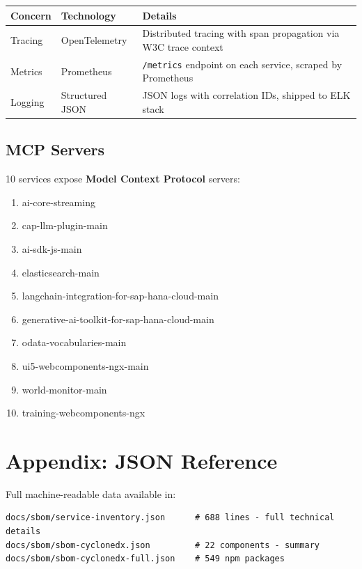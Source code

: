 \documentclass[11pt,a4paper]{article}
\begin{document}
\begin{tabular}{@{}L{3cm}L{3cm}L{8cm}@{}}
\toprule
\textbf{Concern} & \textbf{Technology} & \textbf{Details} \\
\midrule
Tracing & OpenTelemetry & Distributed tracing with span propagation via W3C trace context \\
Metrics & Prometheus & \texttt{/metrics} endpoint on each service, scraped by Prometheus \\
Logging & Structured JSON & JSON logs with correlation IDs, shipped to ELK stack \\
\bottomrule
\end{tabular}

\subsection{MCP Servers}

10 services expose \textbf{Model Context Protocol} servers:

\begin{enumerate}[noitemsep]
    \item ai-core-streaming
    \item cap-llm-plugin-main
    \item ai-sdk-js-main
    \item elasticsearch-main
    \item langchain-integration-for-sap-hana-cloud-main
    \item generative-ai-toolkit-for-sap-hana-cloud-main
    \item odata-vocabularies-main
    \item ui5-webcomponents-ngx-main
    \item world-monitor-main
    \item training-webcomponents-ngx
\end{enumerate}

\newpage

\section{Appendix: JSON Reference}

Full machine-readable data available in:

\begin{lstlisting}
docs/sbom/service-inventory.json      # 688 lines - full technical details
docs/sbom/sbom-cyclonedx.json         # 22 components - summary
docs/sbom/sbom-cyclonedx-full.json    # 549 npm packages
\end{lstlisting}
\end{document}
